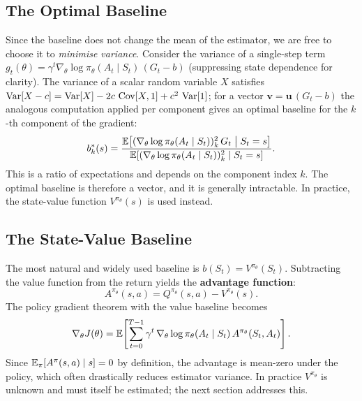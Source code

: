 \subsection{The Optimal Baseline}

Since the baseline does not change the mean of the estimator, we are free to choose it to \emph{minimise variance}.  Consider the variance of a single-step term $g_t(\theta) = \gamma^t \nabla_\theta \log \pi_\theta(A_t \mid S_t)\, (G_t - b)$ (suppressing state dependence for clarity).  The variance of a scalar random variable $X$ satisfies $\operatorname{Var}[X - c] = \operatorname{Var}[X] - 2c\, \operatorname{Cov}[X, 1] + c^2\, \operatorname{Var}[1]$; for a vector $\mathbf{v} = \mathbf{u}\,(G_t - b)$ the analogous computation applied per component gives an optimal baseline for the $k$-th component of the gradient:
\begin{equation}
\label{eq:optimal-baseline}
b^*_k(s) = \frac{\operatorname{\mathbb{E}}\!\left[(\nabla_\theta \log \pi_\theta(A_t \mid S_t))^2_k\, G_t \;\middle|\; S_t = s\right]}{\operatorname{\mathbb{E}}\!\left[(\nabla_\theta \log \pi_\theta(A_t \mid S_t))^2_k \;\middle|\; S_t = s\right]}.
\end{equation}
This is a ratio of expectations and depends on the component index $k$.  The optimal baseline is therefore a vector, and it is generally intractable.  In practice, the state-value function $V^{\pi_\theta}(s)$ is used instead.

\subsection{The State-Value Baseline}

The most natural and widely used baseline is $b(S_t) = V^{\pi_\theta}(S_t)$.  Subtracting the value function from the return yields the \textbf{advantage function}:
\begin{equation}
\label{eq:advantage-ch8}
A^{\pi_\theta}(s,a) = Q^{\pi_\theta}(s,a) - V^{\pi_\theta}(s).
\end{equation}
The policy gradient theorem with the value baseline becomes
\begin{equation}
\label{eq:pg-advantage}
\nabla_\theta J(\theta)
= \operatorname{\mathbb{E}}\!\left[\sum_{t=0}^{T-1} \gamma^t\, \nabla_\theta \log \pi_\theta(A_t \mid S_t)\, A^{\pi_\theta}(S_t, A_t)\right].
\end{equation}
Since $\operatorname{\mathbb{E}}_\pi[A^{\pi}(s,a) \mid s] = 0$ by definition, the advantage is mean-zero under the policy, which often drastically reduces estimator variance.  In practice $V^{\pi_\theta}$ is unknown and must itself be estimated; the next section addresses this.

